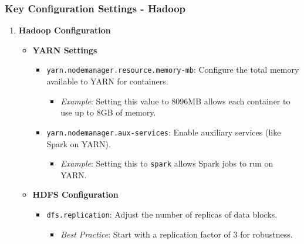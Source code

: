 \documentclass{beamer}
\begin{document}
\begin{frame}[fragile]
    \frametitle{Key Configuration Settings - Hadoop}
    \begin{enumerate}
        \item \textbf{Hadoop Configuration}
        \begin{itemize}
            \item \textbf{YARN Settings}
            \begin{itemize}
                \item \texttt{yarn.nodemanager.resource.memory-mb}: Configure the total memory available to YARN for containers.
                \begin{itemize}
                    \item \textit{Example}: Setting this value to 8096MB allows each container to use up to 8GB of memory.
                \end{itemize}
                \item \texttt{yarn.nodemanager.aux-services}: Enable auxiliary services (like Spark on YARN).
                \begin{itemize}
                    \item \textit{Example}: Setting this to \texttt{spark} allows Spark jobs to run on YARN.
                \end{itemize}
            \end{itemize}
            \item \textbf{HDFS Configuration}
            \begin{itemize}
                \item \texttt{dfs.replication}: Adjust the number of replicas of data blocks.
                \begin{itemize}
                    \item \textit{Best Practice}: Start with a replication factor of 3 for robustness.
                \end{itemize}
            \end{itemize}
        \end{itemize}
    \end{enumerate}
\end{frame}
\end{document}
